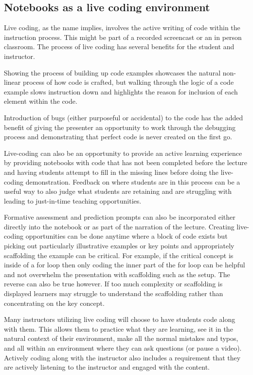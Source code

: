 \documentclass[]{book}
\begin{document}
\subsection{Notebooks as a live coding
environment}\label{notebooks-as-a-live-coding-environment}

Live coding, as the name implies, involves the active writing of code
within the instruction process. This might be part of a recorded
screencast or an in person classroom. The process of live coding has
several benefits for the student and instructor.

Showing the process of building up code examples showcases the natural
non-linear process of how code is crafted, but walking through the logic
of a code example slows instruction down and highlights the reason for
inclusion of each element within the code.

Introduction of bugs (either purposeful or accidental) to the code has
the added benefit of giving the presenter an opportunity to work through
the debugging process and demonstrating that perfect code is never
created on the first go.

Live-coding can also be an opportunity to provide an active learning
experience by providing notebooks with code that has not been completed
before the lecture and having students attempt to fill in the missing
lines before doing the live-coding demonstration. Feedback on where
students are in this process can be a useful way to also judge what
students are retaining and are struggling with leading to just-in-time
teaching opportunities.

Formative assessment and prediction prompts can also be incorporated
either directly into the notebook or as part of the narration of the
lecture. Creating live-coding opportunities can be done anytime where a
block of code exists but picking out particularly illustrative examples
or key points and appropriately scaffolding the example can be critical.
For example, if the critical concept is inside of a for loop then only
coding the inner part of the for loop can be helpful and not overwhelm
the presentation with scaffolding such as the setup. The reverse can
also be true however. If too much complexity or scaffolding is displayed
learners may struggle to understand the scaffolding rather than
concentrating on the key concept.

Many instructors utilizing live coding will choose to have students code
along with them. This allows them to practice what they are learning,
see it in the natural context of their environment, make all the normal
mistakes and typos, and all within an environment where they can ask
questions (or pause a video). Actively coding along with the instructor
also includes a requirement that they are actively listening to the
instructor and engaged with the content.
\end{document}
